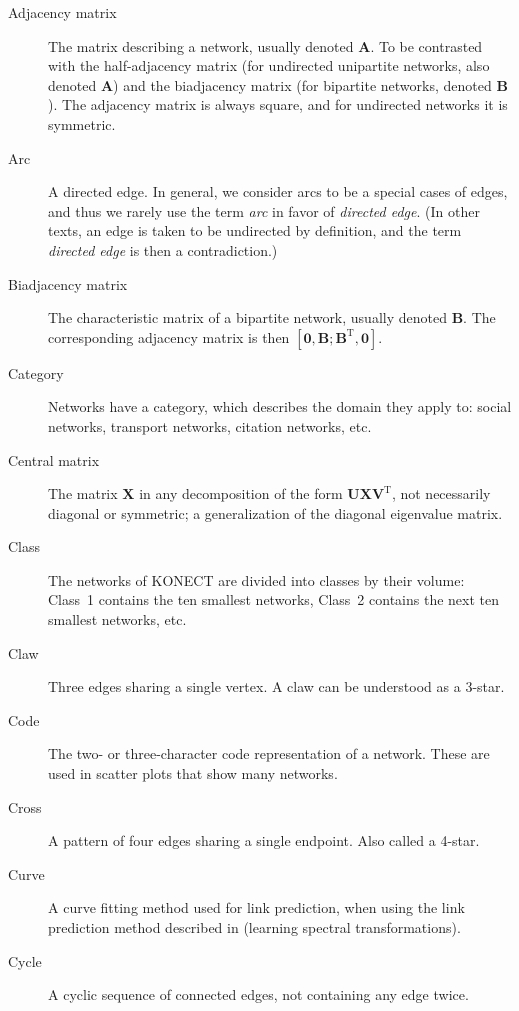 \documentclass{article}
\begin{document}
\begin{description}
  \item[Adjacency matrix]
    The matrix describing a network, usually denoted $\mathbf A$.  To be
    contrasted with the 
    half-adjacency matrix (for undirected unipartite networks, also
    denoted $\mathbf A$) and the
    biadjacency matrix (for bipartite networks, denoted $\mathbf B$). 
    The adjacency matrix is always square, and for undirected networks
    it is symmetric. 
  \item[Arc] A directed edge.  In general, we consider arcs to be a
    special cases of edges, and thus we rarely use the term \emph{arc}
    in favor of \emph{directed edge}.  (In other texts, an edge is taken
    to be undirected by definition, and the term \emph{directed edge} is
    then a contradiction.)
  \item[Biadjacency matrix]
    The characteristic matrix of a bipartite network, usually denoted
    $\mathbf B$.  The corresponding adjacency matrix is then $[\mathbf
      0, \mathbf B; \mathbf B^{\mathrm T}, \mathbf 0]$. 
  \item[Category] Networks have a category, which describes the domain
    they apply to:  social networks, transport networks, citation
    networks, etc. 
  \item[Central matrix] The matrix $\mathbf X$ in any decomposition
    of the form $\mathbf U \mathbf X \mathbf V^{\mathrm T}$, not necessarily
    diagonal or symmetric; a generalization of the diagonal eigenvalue
    matrix.
  \item[Class]
    The networks of KONECT are divided into classes by their volume:
    Class~1 contains the ten smallest networks, Class~2 contains the
    next ten smallest networks, etc.  
  \item[Claw]
    Three edges sharing a single vertex.  A claw can be understood as a 3-star. 
  \item[Code]
    The two- or three-character code representation of a network.  These
    are used in scatter plots that show many networks.  
  \item[Cross]
    A pattern of four edges sharing a single endpoint.  Also called a
    4-star.  
  \item[Curve]
    A curve fitting method used for link prediction, when using the link
    prediction method described
    in \citep{kunegis:spectral-transformation} (learning spectral
    transformations).  
  \item[Cycle] 
    A cyclic sequence of connected edges, not containing any edge twice.

\end{description}
\end{document}
